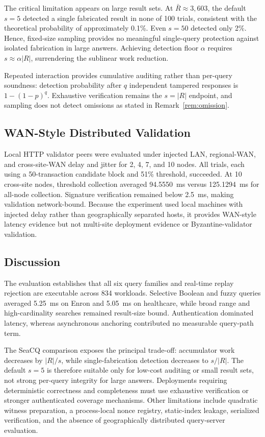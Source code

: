 \documentclass[journal]{IEEEtran}
\theoremstyle{tight}
\theoremstyle{remark}
\theoremstyle{plain}
\begin{document}
The critical limitation appears on large result sets. At \(\bar R\approx3{,}603\), the default \(s=5\) detected a single fabricated result in none of 100 trials, consistent with the theoretical probability of approximately 0.1\%. Even \(s=50\) detected only 2\%. Hence, fixed-size sampling provides no meaningful single-query protection against isolated fabrication in large answers. Achieving detection floor \(\alpha\) requires \(s\approx\alpha|R|\), surrendering the sublinear work reduction.

Repeated interaction provides cumulative auditing rather than per-query soundness: detection probability after \(q\) independent tampered responses is \(1-(1-p)^q\). Exhaustive verification remains the \(s=|R|\) endpoint, and sampling does not detect omissions as stated in Remark~\ref{rem:omission}.

\subsection{WAN-Style Distributed Validation}
\label{4O}

Local HTTP validator peers were evaluated under injected LAN, regional-WAN, and cross-site-WAN delay and jitter for 2, 4, 7, and 10 nodes. All trials, each using a 50-transaction candidate block and 51\% threshold, succeeded. At 10 cross-site nodes, threshold collection averaged 94.5550~ms versus 125.1294~ms for all-node collection. Signature verification remained below 2.5~ms, making validation network-bound. Because the experiment used local machines with injected delay rather than geographically separated hosts, it provides WAN-style latency evidence but not multi-site deployment evidence or Byzantine-validator validation.

\subsection{Discussion}
\label{4P}

The evaluation establishes that all six query families and real-time replay rejection are executable across 834 workloads. Selective Boolean and fuzzy queries averaged 5.25~ms on Enron and 5.05~ms on healthcare, while broad range and high-cardinality searches remained result-size bound. Authentication dominated latency, whereas asynchronous anchoring contributed no measurable query-path term.

The SeaCQ comparison exposes the principal trade-off: accumulator work decreases by \(|R|/s\), while single-fabrication detection decreases to \(s/|R|\). The default \(s=5\) is therefore suitable only for low-cost auditing or small result sets, not strong per-query integrity for large answers. Deployments requiring deterministic correctness and completeness must use exhaustive verification or stronger authenticated coverage mechanisms. Other limitations include quadratic witness preparation, a process-local nonce registry, static-index leakage, serialized verification, and the absence of geographically distributed query-server evaluation.
\end{document}
